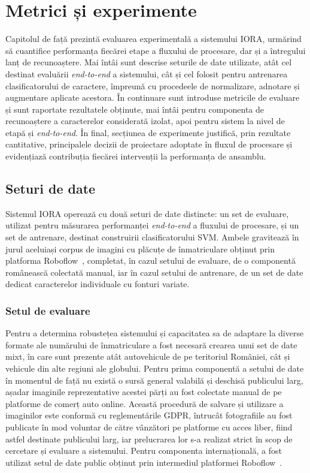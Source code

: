 \chapter{Metrici și experimente}\label{chap:metrici}
\indent\par
Capitolul de față prezintă evaluarea experimentală a sistemului IORA, urmărind să cuantifice performanța fiecărei etape a fluxului de procesare, dar și a întregului lanț de recunoaștere. Mai întâi sunt descrise seturile de date utilizate, atât cel destinat evaluării \textit{end-to-end} a sistemului, cât și cel folosit pentru antrenarea clasificatorului de caractere, împreună cu procedeele de normalizare, adnotare și augmentare aplicate acestora. În continuare sunt introduse metricile de evaluare și sunt raportate rezultatele obținute, mai întâi pentru componenta de recunoaștere a caracterelor considerată izolat, apoi pentru sistem la nivel de etapă și \textit{end-to-end}. În final, secțiunea de experimente justifică, prin rezultate cantitative, principalele decizii de proiectare adoptate în fluxul de procesare și evidențiază contribuția fiecărei intervenții la performanța de ansamblu.

\section{Seturi de date}
\indent\par
Sistemul IORA operează cu două seturi de date distincte: un set de evaluare, utilizat pentru măsurarea performanței \textit{end-to-end} a fluxului de procesare, și un set de antrenare, destinat construirii clasificatorului SVM. Ambele gravitează în jurul aceluiași corpus de imagini cu plăcuțe de înmatriculare obținut prin platforma Roboflow~\cite{roboflow-lp-dataset}, completat, în cazul setului de evaluare, de o componentă românească colectată manual, iar în cazul setului de antrenare, de un set de date dedicat caracterelor individuale cu fonturi variate.

\subsection{Setul de evaluare}
\indent\par
Pentru a determina robustețea sistemului și capacitatea sa de adaptare la diverse formate ale numărului de înmatriculare a fost necesară crearea unui set de date mixt, în care sunt prezente atât autovehicule de pe teritoriul României, cât și vehicule din alte regiuni ale globului. Pentru prima componentă a setului de date în momentul de față nu există o sursă general valabilă și deschisă publicului larg, așadar imaginile reprezentative acestei părți au fost colectate manual de pe platforme de comerț auto online. Această procedură de salvare și utilizare a imaginilor este conformă cu reglementările GDPR, întrucât fotografiile au fost publicate în mod voluntar de către vânzători pe platforme cu acces liber, fiind astfel destinate publicului larg, iar prelucrarea lor s-a realizat strict în scop de cercetare și evaluare a sistemului. Pentru componenta internațională, a fost utilizat setul de date public obținut prin intermediul platformei Roboflow~\cite{roboflow-lp-dataset}.

